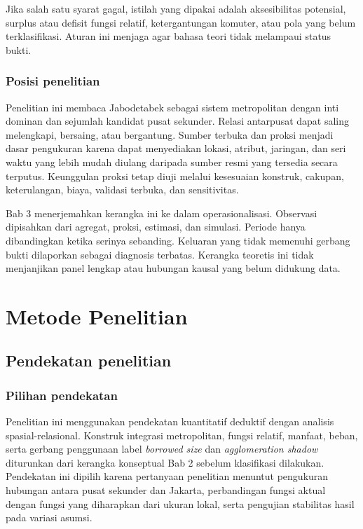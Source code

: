 \documentclass[11pt,a4paper,oneside,openany,indonesian]{report}
\begin{document}
Jika salah satu syarat gagal, istilah yang dipakai adalah aksesibilitas potensial, surplus atau defisit fungsi relatif, ketergantungan komuter, atau pola yang belum terklasifikasi. Aturan ini menjaga agar bahasa teori tidak melampaui status bukti.

\subsection{Posisi penelitian}

Penelitian ini membaca Jabodetabek sebagai sistem metropolitan dengan inti dominan dan sejumlah kandidat pusat sekunder. Relasi antarpusat dapat saling melengkapi, bersaing, atau bergantung. Sumber terbuka dan proksi menjadi dasar pengukuran karena dapat menyediakan lokasi, atribut, jaringan, dan seri waktu yang lebih mudah diulang daripada sumber resmi yang tersedia secara terputus. Keunggulan proksi tetap diuji melalui kesesuaian konstruk, cakupan, keterulangan, biaya, validasi terbuka, dan sensitivitas.

Bab 3 menerjemahkan kerangka ini ke dalam operasionalisasi. Observasi dipisahkan dari agregat, proksi, estimasi, dan simulasi. Periode hanya dibandingkan ketika serinya sebanding. Keluaran yang tidak memenuhi gerbang bukti dilaporkan sebagai diagnosis terbatas. Kerangka teoretis ini tidak menjanjikan panel lengkap atau hubungan kausal yang belum didukung data.

\clearpage

\chapter{Metode Penelitian}
\section{Pendekatan penelitian}\label{pendekatan-penelitian}

\subsection{Pilihan pendekatan}\label{pilihan-pendekatan}

Penelitian ini menggunakan pendekatan kuantitatif deduktif dengan
analisis spasial-relasional. Konstruk integrasi metropolitan,
fungsi relatif, manfaat, beban, serta gerbang penggunaan label
\emph{borrowed size} dan \emph{agglomeration shadow} diturunkan dari
kerangka konseptual Bab 2 sebelum klasifikasi dilakukan. Pendekatan ini
dipilih karena pertanyaan penelitian menuntut pengukuran hubungan antara
pusat sekunder dan Jakarta, perbandingan fungsi aktual dengan fungsi
yang diharapkan dari ukuran lokal, serta pengujian stabilitas hasil pada
variasi asumsi.
\end{document}
